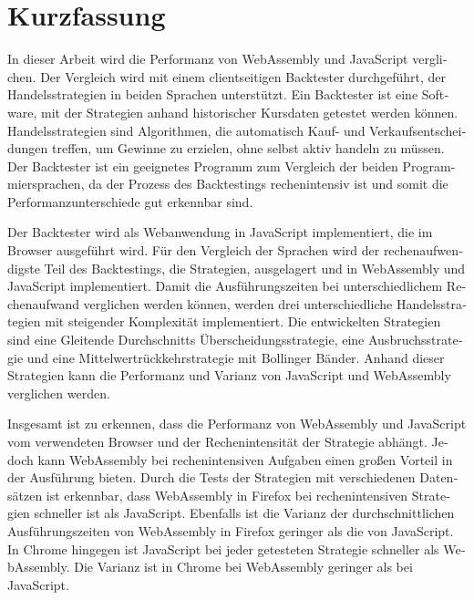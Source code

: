 \chapter{Kurzfassung}

\begin{german}
In dieser Arbeit wird die Performanz von WebAssembly und JavaScript verglichen.
Der Vergleich wird mit einem clientseitigen Backtester durchgeführt, der Handelsstrategien in beiden Sprachen unterstützt.
Ein Backtester ist eine Software, mit der Strategien anhand historischer Kursdaten getestet werden können.
Handelsstrategien sind Algorithmen, die automatisch Kauf- und Verkaufsentscheidungen treffen, um Gewinne zu erzielen, ohne selbst aktiv handeln zu müssen.
Der Backtester ist ein geeignetes Programm zum Vergleich der beiden Programmiersprachen, da der Prozess des Backtestings rechenintensiv ist und somit die Performanzunterschiede gut erkennbar sind.
\newline

Der Backtester wird als Webanwendung in JavaScript implementiert, die im Browser ausgeführt wird.
Für den Vergleich der Sprachen wird der rechenaufwendigste Teil des Backtestings, die Strategien, ausgelagert und in WebAssembly und JavaScript implementiert.
Damit die Ausführungszeiten bei unterschiedlichem Rechenaufwand verglichen werden können, werden drei unterschiedliche Handelsstrategien mit steigender Komplexität implementiert.
Die entwickelten Strategien sind eine Gleitende Durchschnitts Überscheidungsstrategie, eine Ausbruchsstrategie und eine Mittelwertrückkehrstrategie mit Bollinger Bänder.
Anhand dieser Strategien kann die Performanz und Varianz von JavaScript und WebAssembly verglichen werden.
\newline

Insgesamt ist zu erkennen, dass die Performanz von WebAssembly und JavaScript vom verwendeten Browser und der Rechenintensität der Strategie abhängt.
Jedoch kann WebAssembly bei rechenintensiven Aufgaben einen großen Vorteil in der Ausführung bieten.
Durch die Tests der Strategien mit verschiedenen Datensätzen ist erkennbar, dass WebAssembly in Firefox bei rechenintensiven Strategien schneller ist als JavaScript.
Ebenfalls ist die Varianz der durchschnittlichen Ausführungszeiten von WebAssembly in Firefox geringer als die von JavaScript.
In Chrome hingegen ist JavaScript bei jeder getesteten Strategie schneller als WebAssembly.
Die Varianz ist in Chrome bei WebAssembly geringer als bei JavaScript.
\end{german}